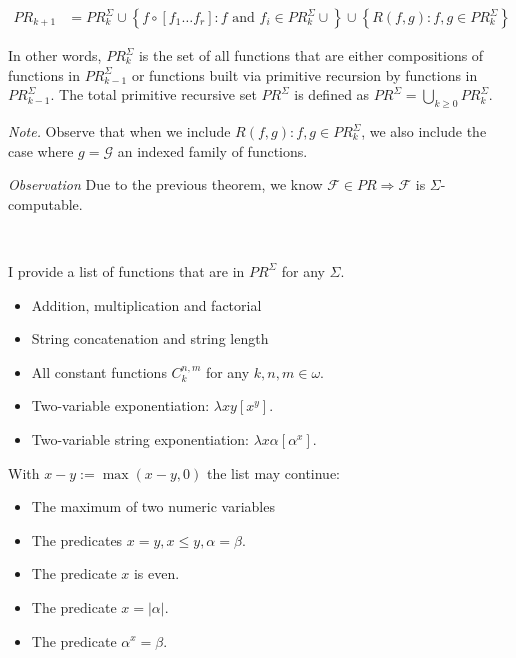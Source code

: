 \documentclass[a4paper, 12pt]{article}
\begin{document}
\begin{align*}
    PR_{k + 1} &= PR_{k}^{\Sigma} \cup \left\{ f \circ \left[ f_1\ldots f_r
    \right] : f \text{ and } f_i \in PR_{k}^{\Sigma} \cup  \right\} \cup \left\{
R(f, g) : f, g \in PR_{k}^{\Sigma}\right\} 
\end{align*}

In other words, $PR_{k}^{\Sigma}$ is the set of all functions that are either
compositions of functions in $PR_{k-1}^{\Sigma}$ or functions built via
primitive recursion by functions in $PR_{k-1}^{\Sigma}$. The total primitive
recursive set $PR^{\Sigma}$ is defined as $PR^{\Sigma} = \bigcup_{k \geq 0}
PR_{k}^{\Sigma}$.

\textit{Note.} Observe that when we include $R(f, g) : f, g \in
PR_{k}^{\Sigma}$, we also include the case where $g = \mathcal{G}$ an indexed
family of functions.

\textit{Observation} Due to the previous theorem, we know $\mathcal{F} \in PR
\Rightarrow \mathcal{F} $ is $\Sigma$-computable.

~ 

I provide a list of functions that are in $PR^{\Sigma}$ for any $\Sigma$.


\begin{itemize}
    \item Addition, multiplication and factorial 
    \item String concatenation and string length  
    \item All constant functions $C_k^{n, m}$ for any $k, n, m \in \omega$.
    \item Two-variable exponentiation: $\lambda xy\left[ x^y \right] $. 
    \item Two-variable string exponentiation: $\lambda x\alpha\left[ \alpha^x
        \right] $.
\end{itemize}

With $x - y := \max(x - y, 0)$ the list may continue: 

\begin{itemize}
    \item The maximum of two numeric variables 
    \item The predicates $x = y, x \leq y, \alpha = \beta$.
    \item The predicate $x$ is even. 
    \item The predicate $x = |\alpha|$. 
    \item The predicate $\alpha^x = \beta$.
\end{itemize}
\end{document}
